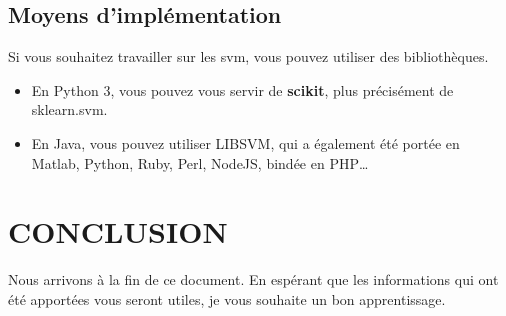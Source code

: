 \documentclass{article}
\begin{document}
\subsection{Moyens d'implémentation}
\vspace{5mm} %
Si vous  souhaitez travailler sur les svm, vous pouvez utiliser des bibliothèques.

\vspace{5mm} %
\begin{itemize}
\item\relax En  Python 3, vous pouvez vous servir de \textbf{scikit}, plus précisément de sklearn.svm.
\item\relax En Java, vous pouvez utiliser LIBSVM, qui a également été portée en Matlab, Python, Ruby, Perl, NodeJS, bindée en PHP…
\end{itemize}
\vspace{5mm} %
\section{CONCLUSION}

Nous arrivons à la fin de ce document. En espérant que les informations qui ont été apportées vous seront utiles, je vous souhaite un bon apprentissage.
\vspace{5mm} %
\end{document}
